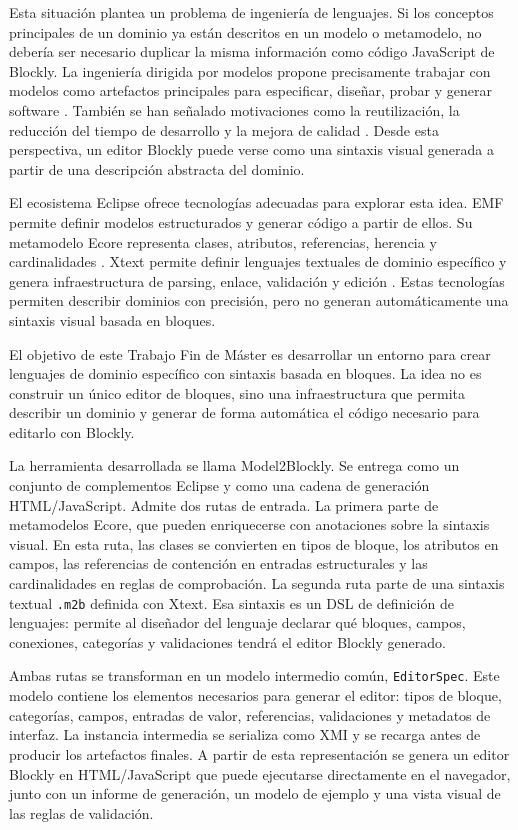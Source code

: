 Esta situación plantea un problema de ingeniería de lenguajes. Si los conceptos
principales de un dominio ya están descritos en un modelo o metamodelo, no
debería ser necesario duplicar la misma información como código
JavaScript de Blockly. La ingeniería dirigida por modelos propone precisamente
trabajar con modelos como artefactos principales para especificar, diseñar,
probar y generar software \cite{brambilla2017modelDriven}. También se han señalado
motivaciones como la reutilización, la reducción del tiempo de desarrollo y la
mejora de calidad \cite{hutchinson2014industry,akdur2018survey}. Desde esta perspectiva, un editor
Blockly puede verse como una sintaxis visual generada a partir de una
descripción abstracta del dominio.

El ecosistema Eclipse ofrece tecnologías adecuadas para explorar esta idea. EMF
permite definir modelos estructurados y generar código a partir de ellos. Su
metamodelo Ecore representa clases, atributos, referencias, herencia y
cardinalidades \cite{emfOverview,steinberg2008emf}. Xtext permite definir
lenguajes textuales de dominio específico y genera infraestructura de parsing,
enlace, validación y edición \cite{xtextProject,bettini2013xtext}. Estas
tecnologías permiten describir dominios con precisión, pero no generan
automáticamente una sintaxis visual basada en bloques.

El objetivo de este Trabajo Fin de Máster es desarrollar un entorno para crear
lenguajes de dominio específico con sintaxis basada en bloques. La idea no es
construir un único editor de bloques, sino una infraestructura que permita
describir un dominio y generar de forma automática el código necesario para
editarlo con Blockly.

La herramienta desarrollada se llama Model2Blockly. Se entrega como un conjunto
de complementos Eclipse y como una cadena de generación HTML/JavaScript. Admite dos
rutas de entrada. La primera parte de metamodelos Ecore, que pueden enriquecerse
con anotaciones sobre la sintaxis visual. En esta ruta, las clases se convierten
en tipos de bloque, los atributos en campos, las referencias de contención en
entradas estructurales y las cardinalidades en reglas de comprobación. La
segunda ruta parte de una sintaxis textual \texttt{.m2b} definida con Xtext. Esa
sintaxis es un DSL de definición de lenguajes: permite al diseñador del
lenguaje declarar qué bloques, campos, conexiones, categorías y validaciones
tendrá el editor Blockly generado.

Ambas rutas se transforman en un modelo intermedio común,
\texttt{EditorSpec}. Este modelo contiene los
elementos necesarios para generar el editor: tipos de bloque, categorías, campos,
entradas de valor, referencias, validaciones y metadatos de interfaz. La
instancia intermedia se serializa como XMI y se recarga antes de producir los
artefactos finales. A partir de esta representación se genera un editor Blockly
en HTML/JavaScript que puede ejecutarse directamente en el navegador, junto con
un informe de generación, un modelo de ejemplo y una vista visual de las reglas
de validación.

